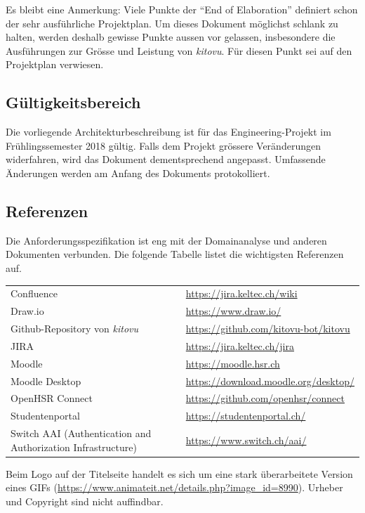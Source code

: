 \documentclass[a4paper]{article}
\def\jiraurl{https://jira.keltec.ch/jira}
\def\confluenceurl{https://jira.keltec.ch/wiki}
\begin{document}
Es bleibt eine Anmerkung: Viele Punkte der ``End of Elaboration'' definiert schon der sehr ausführliche Projektplan. Um dieses Dokument möglichst schlank zu halten, werden deshalb gewisse Punkte aussen vor gelassen, insbesondere die Ausführungen zur Grösse und Leistung von \emph{kitovu}. Für diesen Punkt sei auf den Projektplan verwiesen.

\subsection{Gültigkeitsbereich}
Die vorliegende Architekturbeschreibung ist für das Engineering-Projekt im Frühlingssemester 2018 gültig. Falls dem Projekt grössere Veränderungen widerfahren, wird das Dokument dementsprechend angepasst. Umfassende Änderungen werden am Anfang des Dokuments protokolliert.

\subsection{Referenzen}
Die Anforderungsspezifikation ist eng mit der Domainanalyse und anderen Dokumenten verbunden. Die folgende Tabelle listet die wichtigsten Referenzen auf.

\begin{tabulary}{\linewidth}{Ll}
	Confluence & \url{\confluenceurl} \\
	Draw.io & \url{https://www.draw.io/} \\
	Github-Repository von \emph{kitovu} & \url{https://github.com/kitovu-bot/kitovu} \\
	JIRA	& \url{\jiraurl} \\
	Moodle & \url{https://moodle.hsr.ch} \\
	Moodle Desktop & \url{https://download.moodle.org/desktop/} \\
	OpenHSR Connect & \url{https://github.com/openhsr/connect} \\
	Studentenportal & \url{https://studentenportal.ch/} \\
	Switch AAI \newline (Authentication and Authorization Infrastructure)& \url{https://www.switch.ch/aai/} \\
\end{tabulary}

Beim Logo auf der Titelseite handelt es sich um eine stark überarbeitete Version eines GIFs (\url{https://www.animateit.net/details.php?image_id=8990}). Urheber und Copyright sind nicht auffindbar.

\pagebreak
\end{document}
